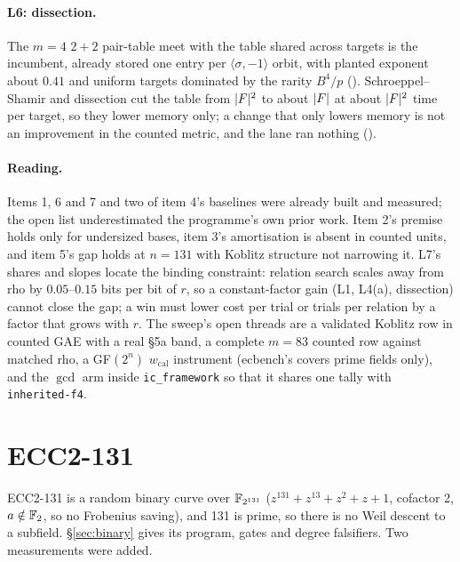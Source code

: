 \paragraph{L6: dissection.} The $m=4$ $2+2$ pair-table meet with the table
shared across targets is the incumbent, already stored one entry per
$\langle\sigma,-1\rangle$ orbit, with planted exponent about $0.41$ and
uniform targets dominated by the rarity $B^4/p$
(). Schroeppel--Shamir
and dissection cut the table from $\lvert F \rvert^2$ to about $\lvert F \rvert$ at about
$\lvert F \rvert^2$ time per target, so they lower memory only; a change that only
lowers memory is not an improvement in the counted metric, and the lane ran
nothing
().

\paragraph{Reading.} Items 1, 6 and 7 and two of item 4's baselines were
already built and measured; the open list underestimated the programme's
own prior work. Item 2's premise holds only for undersized bases, item 3's
amortisation is absent in counted units, and item 5's gap holds at
$n=131$ with Koblitz structure not narrowing it. L7's shares and slopes
locate the binding constraint: relation search scales away from rho by
$0.05$--$0.15$ bits per bit of $r$, so a constant-factor gain (L1, L4(a),
dissection) cannot close the gap; a win must lower cost per trial or trials
per relation by a factor that grows with $r$. The sweep's open threads are
a validated Koblitz row in counted GAE with a real §5a band, a complete
$m=83$ counted row against matched rho, a GF$(2^n)$ $w_{\mathrm{cal}}$
instrument (ecbench's covers prime fields only), and the $\gcd$ arm inside
\texttt{ic\_framework} so that it shares one tally with
\texttt{inherited-f4}.

\section{ECC2-131}\label{sec:bt-ecc2-131}

ECC2-131 is a random binary curve over $\mathbb{F}_{2^{131}}$ ($z^{131}+z^{13}+z^2+z+1$,
cofactor 2, $a\notin\mathbb{F}_2$, so no Frobenius saving), and 131 is prime, so
there is no Weil descent to a subfield. \S\ref{sec:binary} gives its program,
gates and degree falsifiers. Two measurements were added.


